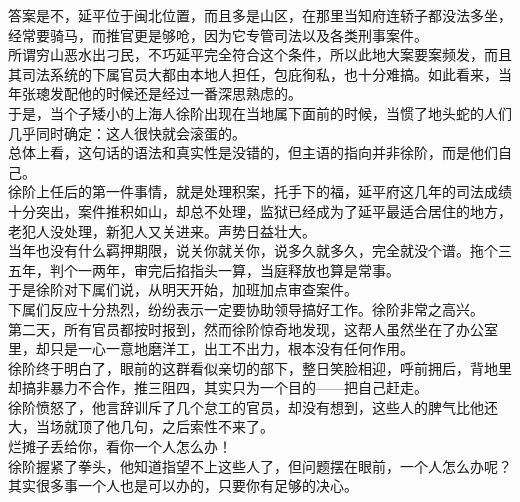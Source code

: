 \begin{multicols}{\theparacolNo}
答案是不，延平位于闽北位置，而且多是山区，在那里当知府连轿子都没法多坐，经常要骑马，而推官更是够呛，因为它专管司法以及各类刑事案件。\\

所谓穷山恶水出刁民，不巧延平完全符合这个条件，所以此地大案要案频发，而且其司法系统的下属官员大都由本地人担任，包庇徇私，也十分难搞。如此看来，当年张璁发配他的时候还是经过一番深思熟虑的。\\

于是，当个子矮小的上海人徐阶出现在当地属下面前的时候，当惯了地头蛇的人们几乎同时确定：这人很快就会滚蛋的。\\

总体上看，这句话的语法和真实性是没错的，但主语的指向并非徐阶，而是他们自己。\\

徐阶上任后的第一件事情，就是处理积案，托手下的福，延平府这几年的司法成绩十分突出，案件推积如山，却总不处理，监狱已经成为了延平最适合居住的地方，老犯人没处理，新犯人又关进来。声势日益壮大。\\

当年也没有什么羁押期限，说关你就关你，说多久就多久，完全就没个谱。拖个三五年，判个一两年，审完后掐指头一算，当庭释放也算是常事。\\

于是徐阶对下属们说，从明天开始，加班加点审查案件。\\

下属们反应十分热烈，纷纷表示一定要协助领导搞好工作。徐阶非常之高兴。\\

第二天，所有官员都按时报到，然而徐阶惊奇地发现，这帮人虽然坐在了办公室里，却只是一心一意地磨洋工，出工不出力，根本没有任何作用。\\

徐阶终于明白了，眼前的这群看似亲切的部下，整日笑脸相迎，呼前拥后，背地里却搞非暴力不合作，推三阻四，其实只为一个目的——把自己赶走。\\

徐阶愤怒了，他言辞训斥了几个怠工的官员，却没有想到，这些人的脾气比他还大，当场就顶了他几句，之后索性不来了。\\

烂摊子丢给你，看你一个人怎么办！\\

徐阶握紧了拳头，他知道指望不上这些人了，但问题摆在眼前，一个人怎么办呢？\\

其实很多事一个人也是可以办的，只要你有足够的决心。\\


\end{multicols}
